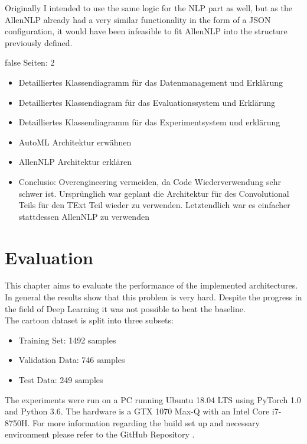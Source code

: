 \documentclass[draft,final,oneside]{vutinfth} %
\begin{document}
Originally I intended to use the same logic for the NLP part as well, but as the AllenNLP already had a very similar functionality in the form of a JSON configuration, it would have been infeasible to fit AllenNLP into the structure previously defined.


\if false
Seiten: 2

\begin{itemize}

\item Detailliertes Klassendiagramm für das Datenmanagement und Erklärung
\item Detailliertes Klassendiagram für das Evaluationssystem und Erklärung
\item Detailliertes Klassendiagramm für das Experimentsystem und erklärung 
\item AutoML Architektur erwähnen
\item AllenNLP Architektur erklären
\item Conclusio: Overengineering vermeiden, da Code Wiederverwendung sehr schwer ist. Ursprünglich war geplant die Architektur für des Convolutional Teils für den TExt Teil wieder zu verwenden. Letztendlich war es einfacher stattdessen AllenNLP zu verwenden

\end{itemize}

\fi


\chapter{Evaluation} \label{evaluationchapter}

This chapter aims to evaluate the performance of the implemented architectures. In
general the results show that this problem is very hard. Despite the progress in the field of Deep Learning it was not possible to beat the baseline. \\

The cartoon dataset is split into three subsets:

\begin{itemize}
\item Training Set: 1492 samples %
\item Validation Data: 746 samples %
\item Test Data: 249 samples %
\end{itemize}

The experiments were run on a PC running Ubuntu 18.04 LTS using PyTorch 1.0 and
Python 3.6. The hardware is a GTX 1070 Max-Q with an Intel Core i7-8750H. For more
information regarding the build set up and necessary environment please refer to the GitHub Repository \cite{deephumorrepo}.
\end{document}
